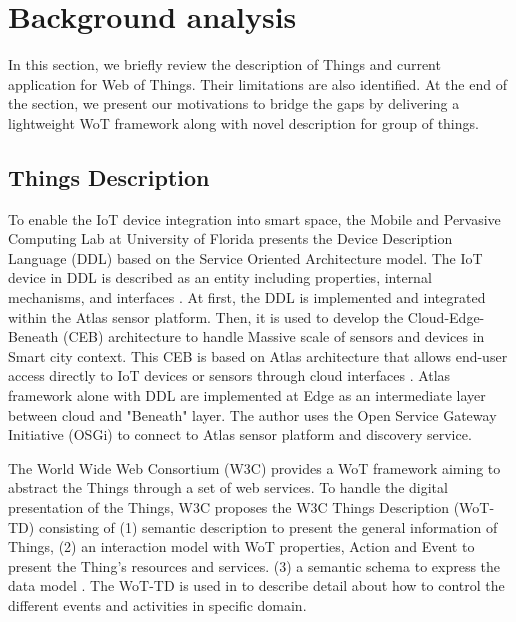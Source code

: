 \section{Background analysis}


In this section, we briefly review the description of Things and current application for Web of Things. Their limitations are also identified. At the end of the section, we present our motivations to bridge the gaps by delivering a lightweight WoT framework along with novel description for group of things.
\subsection{Things Description}
To enable the IoT device integration into smart space, the Mobile and Pervasive Computing Lab at University of Florida presents the Device Description Language (DDL) based on the Service Oriented Architecture model. The IoT device in DDL is described as an entity including properties, internal mechanisms, and interfaces  \cite{chen2009device}. At first, the DDL is implemented and integrated within the Atlas sensor platform. Then, it is used to develop the Cloud-Edge-Beneath (CEB) architecture \cite{xu2016scalable} to handle Massive scale of sensors and devices in Smart city context. This CEB is based on Atlas architecture that allows end-user access directly to IoT devices or sensors through cloud interfaces \cite{bose2006building}\cite{chen2009atlas}. Atlas framework alone with DDL are implemented at Edge as an intermediate layer between cloud and "Beneath" layer. The author uses the Open Service Gateway Initiative (OSGi) to connect to Atlas sensor platform and discovery service. 

The World Wide Web Consortium (W3C) provides a WoT framework aiming to abstract the Things through a set of web services. To handle the digital presentation of the Things, W3C proposes the W3C Things Description (WoT-TD) consisting of (1) semantic description to present the general information of Things, (2) an interaction model with WoT properties, Action and Event to present the Thing's resources and services. (3) a semantic schema to express the data model \cite{W3C_TD}. The WoT-TD is used in \cite{kaebisch2016thing} to describe detail about how to control the different events and activities in specific domain.

